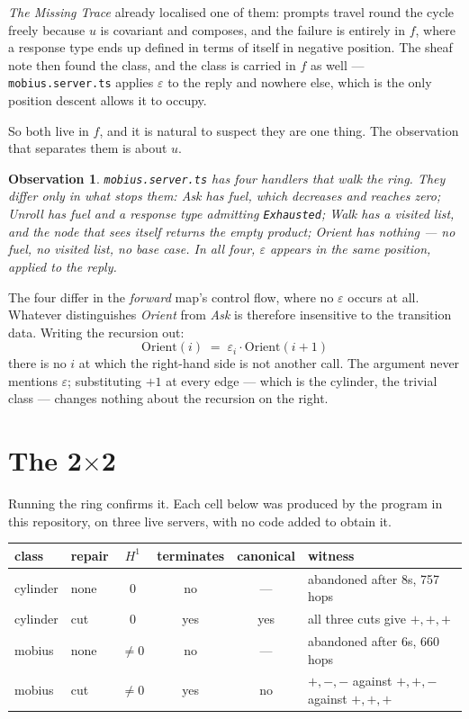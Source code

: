 \documentclass[11pt,a4paper]{article}
\newtheorem*{obs}{Observation}
\begin{document}
\emph{The Missing Trace} already localised one of them: prompts travel round the
cycle freely because $u$ is covariant and composes, and the failure is entirely in
$f$, where a response type ends up defined in terms of itself in negative position.
The sheaf note then found the class, and the class is carried in $f$ as well ---
\texttt{mobius.server.ts} applies $\varepsilon$ to the reply and nowhere else,
which is the only position descent allows it to occupy.

So both live in $f$, and it is natural to suspect they are one thing. The
observation that separates them is about $u$.

\begin{obs}
\texttt{mobius.server.ts} has four handlers that walk the ring. They differ only in
what stops them:
\emph{Ask} has fuel, which decreases and reaches zero;
\emph{Unroll} has fuel and a response type admitting \texttt{Exhausted};
\emph{Walk} has a visited list, and the node that sees itself returns the empty
product; \emph{Orient} has nothing --- no fuel, no visited list, no base case.
In all four, $\varepsilon$ appears in the same position, applied to the reply.
\end{obs}

The four differ in the \emph{forward} map's control flow, where no $\varepsilon$
occurs at all. Whatever distinguishes \emph{Orient} from \emph{Ask} is therefore
insensitive to the transition data. Writing the recursion out:
\[
  \mathrm{Orient}(i) \;=\; \varepsilon_i \cdot \mathrm{Orient}(i+1)
\]
there is no $i$ at which the right-hand side is not another call. The argument
never mentions $\varepsilon$; substituting $+1$ at every edge --- which is the
cylinder, the trivial class --- changes nothing about the recursion on the right.

\section{The 2$\times$2}

Running the ring confirms it. Each cell below was produced by the program in this
repository, on three live servers, with no code added to obtain it.

\begin{center}
\small
\begin{tabular}{llcccl}
\toprule
\textbf{class} & \textbf{repair} & $H^1$ & \textbf{terminates} & \textbf{canonical} & \textbf{witness} \\
\midrule
cylinder & none & $0$ & no  & ---  & abandoned after 8s, 757 hops \\
cylinder & cut  & $0$ & yes & yes  & all three cuts give $+,+,+$ \\
mobius   & none & $\neq 0$ & no  & ---  & abandoned after 6s, 660 hops \\
mobius   & cut  & $\neq 0$ & yes & no   & $+,-,-$ against $+,+,-$ against $+,+,+$ \\
\bottomrule
\end{tabular}
\end{center}
\end{document}
